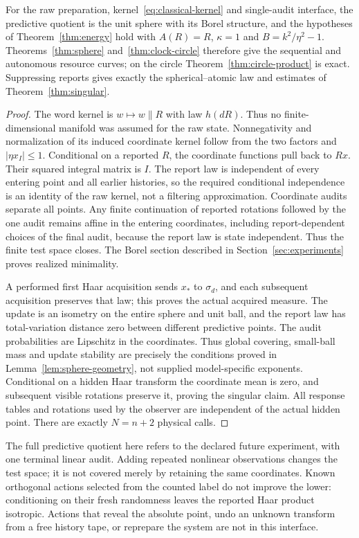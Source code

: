 \begin{theorem}\label{thm:classical}
For the raw preparation, kernel~\eqref{eq:classical-kernel} and single-audit interface, the predictive quotient is the unit sphere with its Borel structure, and the hypotheses of Theorem~\ref{thm:energy} hold with $A(R)=R$, $\kappa=1$ and $B=k^2/\eta^2-1$. Theorems~\ref{thm:sphere} and~\ref{thm:clock-circle} therefore give the sequential and autonomous resource curves; on the circle Theorem~\ref{thm:circle-product} is exact. Suppressing reports gives exactly the spherical--atomic law and estimates of Theorem~\ref{thm:singular}.
\end{theorem}
\begin{proof}
The word kernel is $w\mapsto w\mathbin{\|}R$ with law $h(dR)$. Thus no finite-dimensional manifold was assumed for the raw state. Nonnegativity and normalization of its induced coordinate kernel follow from the two factors and $|\eta x_I|\le1$. Conditional on a reported $R$, the coordinate functions pull back to $Rx$. Their squared integral matrix is $I$. The report law is independent of every entering point and all earlier histories, so the required conditional independence is an identity of the raw kernel, not a filtering approximation. Coordinate audits separate all points. Any finite continuation of reported rotations followed by the one audit remains affine in the entering coordinates, including report-dependent choices of the final audit, because the report law is state independent. Thus the finite test space closes. The Borel section described in Section~\ref{sec:experiments} proves realized minimality.

A performed first Haar acquisition sends $x_*$ to $\sigma_d$, and each subsequent acquisition preserves that law; this proves the actual acquired measure. The update is an isometry on the entire sphere and unit ball, and the report law has total-variation distance zero between different predictive points. The audit probabilities are Lipschitz in the coordinates. Thus global covering, small-ball mass and update stability are precisely the conditions proved in Lemma~\ref{lem:sphere-geometry}, not supplied model-specific exponents. Conditional on a hidden Haar transform the coordinate mean is zero, and subsequent visible rotations preserve it, proving the singular claim. All response tables and rotations used by the observer are independent of the actual hidden point. There are exactly $N=n+2$ physical calls.
\end{proof}
The full predictive quotient here refers to the declared future experiment, with one terminal linear audit. Adding repeated nonlinear observations changes the test space; it is not covered merely by retaining the same coordinates. Known orthogonal actions selected from the counted label do not improve the lower: conditioning on their fresh randomness leaves the reported Haar product isotropic. Actions that reveal the absolute point, undo an unknown transform from a free history tape, or reprepare the system are not in this interface.

